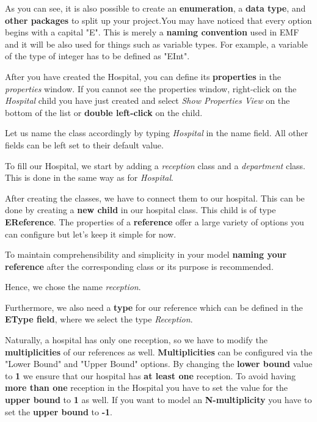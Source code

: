As you can see, it is also possible to create an \textbf{enumeration}, a \textbf{data type}, and \textbf{other packages} to split up your project.\newline You may have noticed that every option begins with a capital "E". This is merely a \textbf{naming convention} used in EMF and it will be also used for things such as variable types. For example, a variable of the type of integer has to be defined as "EInt".\newline

After you have created the Hospital, you can define its \textbf{properties} in the \textsf{\textit{properties}} window. If you cannot see the properties window, right-click on the \textit{\textsf{Hospital}} child you have just created and select \textit{\textsf{Show Properties View}} on the bottom of the list or \textbf{double left-click} on the child.

Let us name the class accordingly by typing \textit{\textsf{Hospital}} in the name field. All other fields can be left set to their default value.\newline

To fill our Hospital, we start by adding a \textsf{\textit{reception}} class and a \textsf{\textit{department}} class. This is done in the same way as for \textit{\textsf{Hospital}}.\newline

After creating the classes, we have to connect them to our hospital. This can be done by creating a \textbf{new child} in our hospital class. This child is of type \textbf{EReference}.
The properties of a \textbf{reference} offer a large variety of options you can configure but let's keep it simple for now.

To maintain comprehensibility and simplicity in your model \textbf{naming your reference} after the corresponding class or its purpose is recommended.

Hence, we chose the name \textsf{\textit{reception}}.\newline

Furthermore, we also need a \textbf{type} for our reference which can be defined in the \textbf{EType field}, where we select the type \textsf{\textit{Reception}}.\newline

Naturally, a hospital has only one reception, so we have to modify the \textbf{multiplicities} of our references as well. \textbf{Multiplicities} can be configured via the \textsf{"Lower Bound"} and \textsf{"Upper Bound"} options. By changing the \textbf{lower bound} value to \textbf{1} we ensure that our hospital has \textbf{at least one} reception. To avoid having \textbf{more than one} reception in the Hospital you have to set the value for the \textbf{upper bound} to \textbf{1} as well. If you want to model an \textbf{N-multiplicity} you have to set the \textbf{upper bound} to \textbf{-1}.\newline

